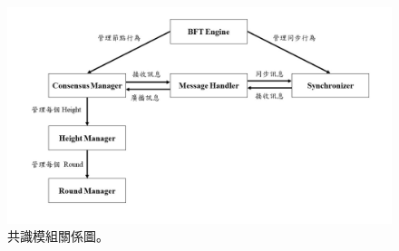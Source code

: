 \begin{figure}[h]
\centering
\includegraphics[scale=0.45]{images/5.jpg}
\caption{共識模組關係圖。}
\label{i:byz-latency}
\end{figure}
